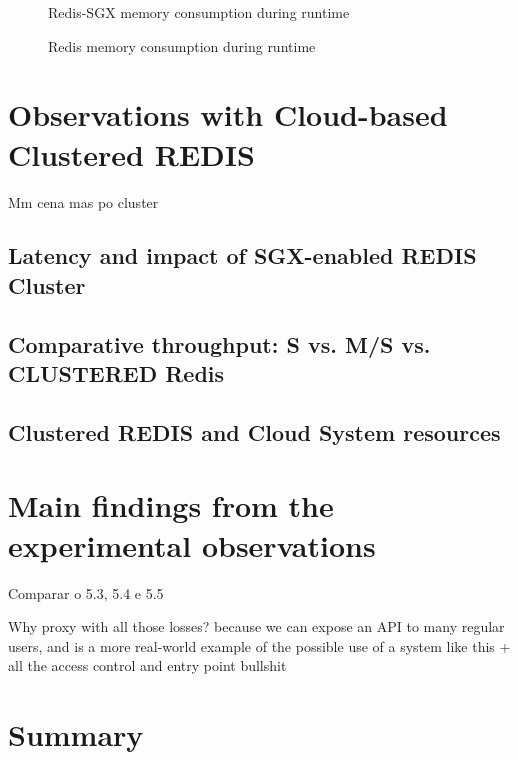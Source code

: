 \begin{figure}[htbp]
	\centering
	\caption{Redis-SGX memory consumption during runtime}
	\label{fig:sgxMemoryConsumption}
\end{figure}

\begin{figure}[htbp]
	\centering
	\caption{Redis memory consumption during runtime}
	\label{fig:noSgxMemoryConsumption}
\end{figure}

\section{Observations with Cloud-based Clustered REDIS}
Mm cena mas po cluster

\subsection{Latency and impact of SGX-enabled REDIS Cluster}

\subsection{Comparative throughput: S  vs. M/S vs. CLUSTERED Redis}

\subsection{Clustered REDIS and Cloud System resources}

\section{Main findings from the experimental observations}

Comparar o 5.3, 5.4 e 5.5

Why proxy with all those losses? because we can expose an API to many regular users, and is a more real-world example of the possible use of a system like this + all the access control and entry point bullshit

\section{Summary}


